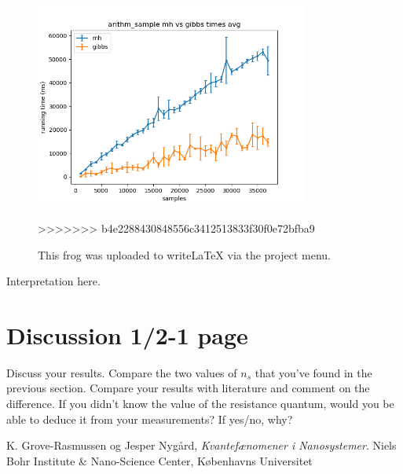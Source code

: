 \documentclass[a4paper]{article}
\begin{document}
\begin{figure}
\centering
\includegraphics[width=0.8\textwidth]{plot_arithm_sample_mh_vs_gibbs_times.png}
\caption{\label{fig:frog}This frog was uploaded to writeLaTeX via the project menu.}
>>>>>>> b4e2288430848556c3412513833f30f0e72bfba9
\end{figure}

Interpretation here.

\section{Discussion 1/2-1 page}
Discuss your results. Compare the two values of $n_{s}$ that you've found in the previous section. Compare your results with literature and comment on the difference. If you didn't know the value of the resistance quantum, would you be able to deduce it from your measurements? If yes/no, why?

\begin{thebibliography}{9}
  K. Grove-Rasmussen og Jesper Nygård,
  \emph{Kvantefænomener i Nanosystemer}.
  Niels Bohr Institute \& Nano-Science Center, Københavns Universitet

\end{thebibliography}
\end{document}
